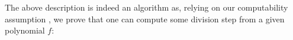 %
%


\noindent
The above description is indeed an algorithm as, relying on our computability assumption , we prove that
one can compute some division step from a given polynomial $f$: 
%

